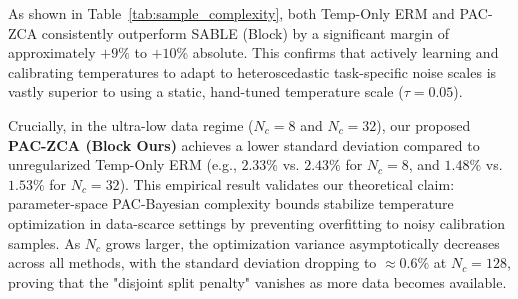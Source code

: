 As shown in Table~\ref{tab:sample_complexity}, both Temp-Only ERM and PAC-ZCA consistently outperform SABLE (Block) by a significant margin of approximately $+9\%$ to $+10\%$ absolute. This confirms that actively learning and calibrating temperatures to adapt to heteroscedastic task-specific noise scales is vastly superior to using a static, hand-tuned temperature scale ($\tau=0.05$). 

Crucially, in the ultra-low data regime ($N_c = 8$ and $N_c = 32$), our proposed \textbf{PAC-ZCA (Block Ours)} achieves a lower standard deviation compared to unregularized Temp-Only ERM (e.g., $2.33\%$ vs. $2.43\%$ for $N_c=8$, and $1.48\%$ vs. $1.53\%$ for $N_c=32$). This empirical result validates our theoretical claim: parameter-space PAC-Bayesian complexity bounds stabilize temperature optimization in data-scarce settings by preventing overfitting to noisy calibration samples. As $N_c$ grows larger, the optimization variance asymptotically decreases across all methods, with the standard deviation dropping to $\approx 0.6\%$ at $N_c=128$, proving that the "disjoint split penalty" vanishes as more data becomes available.
